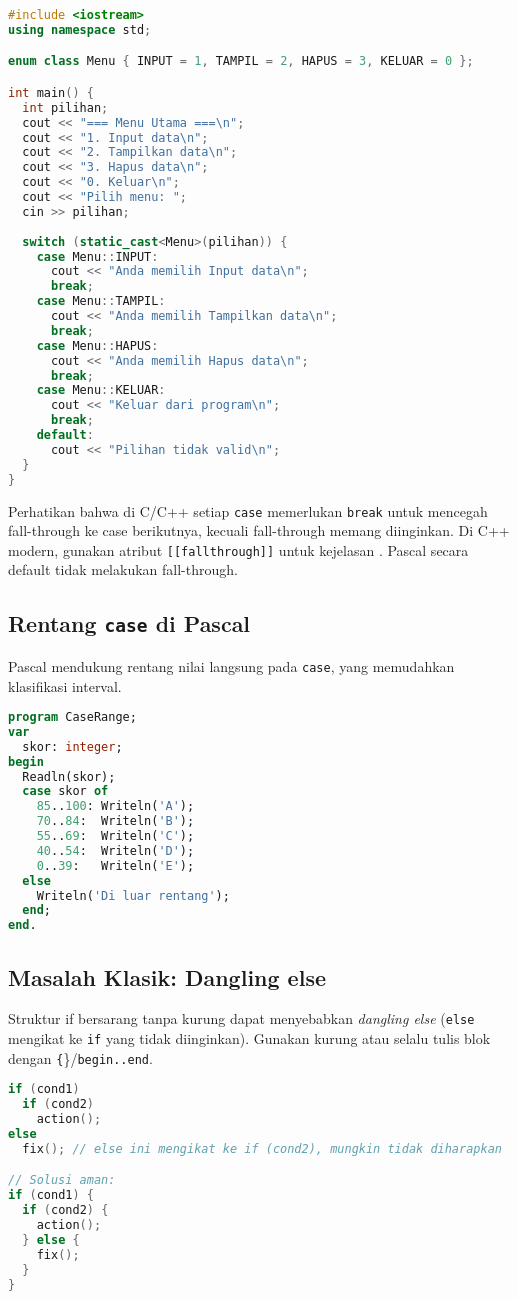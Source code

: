 \documentclass[../main.tex]{subfiles}
\begin{document}
\begin{lstlisting}[language=C++, caption={Menu dengan switch dan enum di C++}]
#include <iostream>
using namespace std;

enum class Menu { INPUT = 1, TAMPIL = 2, HAPUS = 3, KELUAR = 0 };

int main() {
  int pilihan;
  cout << "=== Menu Utama ===\n";
  cout << "1. Input data\n";
  cout << "2. Tampilkan data\n";
  cout << "3. Hapus data\n";
  cout << "0. Keluar\n";
  cout << "Pilih menu: ";
  cin >> pilihan;
  
  switch (static_cast<Menu>(pilihan)) {
    case Menu::INPUT:
      cout << "Anda memilih Input data\n";
      break;
    case Menu::TAMPIL:
      cout << "Anda memilih Tampilkan data\n";
      break;
    case Menu::HAPUS:
      cout << "Anda memilih Hapus data\n";
      break;
    case Menu::KELUAR:
      cout << "Keluar dari program\n";
      break;
    default:
      cout << "Pilihan tidak valid\n";
  }
}
\end{lstlisting}

Perhatikan bahwa di C/C++ setiap \texttt{case} memerlukan \texttt{break} untuk mencegah fall-through ke case berikutnya, kecuali fall-through memang diinginkan. Di C++ modern, gunakan atribut \texttt{[[fallthrough]]} untuk kejelasan \parencite{cpp-fallthrough-attr}. Pascal secara default tidak melakukan fall-through.

\subsection{Rentang \texttt{case} di Pascal}
Pascal mendukung rentang nilai langsung pada \texttt{case}, yang memudahkan klasifikasi interval.
\begin{lstlisting}[language=Pascal, caption={Rentang case di Pascal}]
program CaseRange;
var
  skor: integer;
begin
  Readln(skor);
  case skor of
    85..100: Writeln('A');
    70..84:  Writeln('B');
    55..69:  Writeln('C');
    40..54:  Writeln('D');
    0..39:   Writeln('E');
  else
    Writeln('Di luar rentang');
  end;
end.
\end{lstlisting}

\subsection{Masalah Klasik: Dangling else}
Struktur if bersarang tanpa kurung dapat menyebabkan \emph{dangling else} (\texttt{else} mengikat ke \texttt{if} yang tidak diinginkan). Gunakan kurung atau selalu tulis blok dengan \texttt\{\}/\texttt{begin..end}.
\begin{lstlisting}[language=C, caption={Dangling else dan solusinya}]
if (cond1)
  if (cond2)
    action();
else
  fix(); // else ini mengikat ke if (cond2), mungkin tidak diharapkan

// Solusi aman:
if (cond1) {
  if (cond2) {
    action();
  } else {
    fix();
  }
}
\end{lstlisting}
\end{document}
